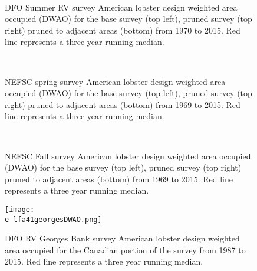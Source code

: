 \documentclass[11pt]{article}
\newcommand{\e}{/backup/bio_data/bio.lobster/figures/} %
\begin{document}
\begin{figure}
\centering
{}
\\
\caption{DFO Summer RV survey American lobster design weighted area occupied (DWAO) for the base survey (top left), pruned survey (top right) pruned to adjacent areas (bottom) from 1970 to 2015. Red line represents a three year running median.}
\end{figure}
\clearpage


\begin{figure}
\centering
{}
\\
\caption{NEFSC spring survey American lobster design weighted area occupied (DWAO) for the base survey (top left), pruned survey (top right) pruned to adjacent areas (bottom) from 1969 to 2015. Red line represents a three year running median. }
\end{figure}
\clearpage


\begin{figure}
\centering
{}
\\
\caption{NEFSC Fall survey American lobster design weighted area occupied (DWAO) for the base survey (top left), pruned survey (top right) pruned to adjacent areas (bottom) from 1969 to 2015. Red line represents a three year running median. }
\end{figure}
\clearpage


\begin{figure}

    \texttt{[image: \\e lfa41georgesDWAO.png]}
    \caption{DFO RV Georges Bank survey American lobster design weighted area occupied for the Canadian portion of the survey from 1987 to 2015. Red line represents a three year running median. }

\end{figure}
\end{document}
